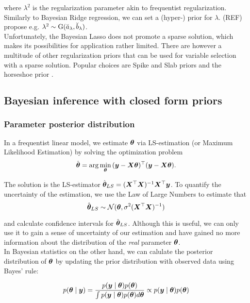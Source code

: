 where $\lambda^2$ is the regularization parameter akin to frequentist regularization.
Similarly to Bayesian Ridge regression, we can set a (hyper-) prior for $\lambda$.
(REF) propose e.g. $\lambda^2 \sim \text{G}(\breve{a}_\lambda, \breve{b}_\lambda)$.\\

Unfortunately, the Bayesian Lasso does not promote a sparse solution, which makes its possibilities for application rather limited.
There are however a multitude of other regularization priors that can be used for variable selection with a sparse solution.
Popular choices are Spike and Slab priors \citep{mitchell_bayesian_1988} and the horseshoe prior \citep{carvalho_horseshoe_2010}.

\subsection{Bayesian inference with closed form priors}

\subsubsection*{Parameter posterior distribution}

In a frequentist linear model, we estimate $\bm{\theta}$ via LS-estimation (or Maximum Likelihood Estimation) by solving the optimization problem
\begin{equation*}
    \hat{\bm{\theta}} = \arg \min_{\bm{\theta}} {(\bm{y} - \bm{X} \bm{\theta})^\top (\bm{y} - \bm{X} \bm{\theta})}.
\end{equation*}

The solution is the LS-estimator $\hat{\bm{\theta}}_{LS} = (\bm{X}^\top \bm{X})^{-1} \bm{X}^\top \bm{y}$.
To quantify the uncertainty of the estimation, we use the Law of Large Numbers to estimate that
\begin{equation}\label{LSE}
    \hat{\bm{\theta}}_{LS} \sim \mathcal{N}(\bm{\theta}, \sigma^2 (\bm{X}^\top \bm{X})^{-1})
\end{equation}

and calculate confidence intervals for $\hat{\bm{\theta}}_{LS}$. Although this is useful, we can only use it to gain a sense of uncertainty of our estimation and have gained no more information about the distribution of the \textit{real} parameter $\bm{\theta}$. \\

In Bayesian statistics on the other hand, we can calulate the posterior distribution of $\bm{\theta}$ by updating the prior distribution with observed data using Bayes' rule:

\begin{equation}\label{eq:bayes}
    p(\bm{\theta} \mid \bm{y}) = \frac{p(\bm{y} \mid \bm{\theta}) p(\bm{\theta})}{\int p(\bm{y} \mid \bm{\theta})p(\bm{\theta}) d \bm{\theta}} \propto p(\bm{y} \mid \bm{\theta}) p(\bm{\theta})
\end{equation}

